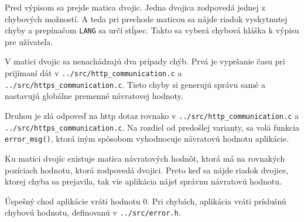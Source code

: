 Pred výpisom sa prejde matica dvojic. Jedna dvojica zodpovedá jednej z chybových možností. A teda pri prechode maticou sa nájde riadok vyskytnutej chyby a prepínačom {\tt LANG} sa určí stĺpec. Takto sa vyberá chybová hláška k výpisu pre užívateľa.

V matici dvojic sa nenachádzajú dva prípady chýb. Prvá je vypršanie času pri prijímaní dát v {\tt ../src/http\_communication.c} a 
\\{\tt ../src/https\_communication.c}. Tieto chyby si generujú správu samé a nastavujú globálne premenné návratovej hodnoty.

Druhou je zlá odpoveď na http dotaz rovnako v {\tt ../src/http\_communication.c} a 
\\{\tt ../src/https\_communication.c}. Na rozdiel od predošlej varianty, sa volá funkcia
\\{\tt error\_msg()}, ktorá iným spôsobom vyhodnocuje návratovú hodnotu aplikácie.

Ku matici dvojíc existuje matica návratových hodnôt, ktorá má na rovnakých pozíciach hodnotu, ktorá zodpovedá dvojici. Preto keď sa nájde riadok dvojice, ktorej chyba sa prejavila, tak vie aplikácia nájsť správnu návratovú hodnotu. 

Úspešný chod aplikácie vráti hodnotu 0. Pri chybách, aplikácia vráti príslušnú chybovú hodnotu, definovanú v {\tt ../src/error.h}.

